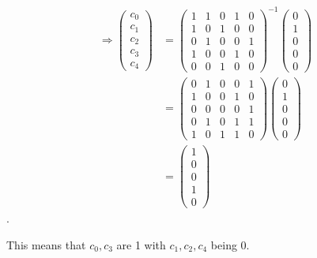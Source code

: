 \begin{enumerate}
\begin{align*}
\Rightarrow 
\begin{pmatrix}
c_0 \\ c_1 \\ c_2 \\ c_3 \\ c_4
\end{pmatrix}
&=
\begin{pmatrix}
1 & 1 & 0 & 1 & 0 \\
1 & 0 & 1 & 0 & 0 \\
0 & 1 & 0 & 0 & 1 \\
1 & 0 & 0 & 1 & 0 \\
0 & 0 & 1 & 0 & 0 
\end{pmatrix}^{-1}
\begin{pmatrix} 0 \\  1 \\ 0 \\ 0 \\ 0 \end{pmatrix} \\
&=
\begin{pmatrix}
0 & 1 & 0 & 0 & 1 \\
1 & 0 & 0 & 1 & 0 \\
0 & 0 & 0 & 0 & 1 \\
0 & 1 & 0 & 1 & 1 \\
1 & 0 & 1 & 1 & 0
\end{pmatrix}
\begin{pmatrix} 0 \\  1 \\ 0 \\ 0 \\ 0 \end{pmatrix} \\
&=
\begin{pmatrix} 1 \\  0 \\ 0 \\ 1 \\ 0 \end{pmatrix}
\end{align*}.

This means that $c_0, c_3$ are 1 with $c_1, c_2, c_4$ being 0.


\end{enumerate}
